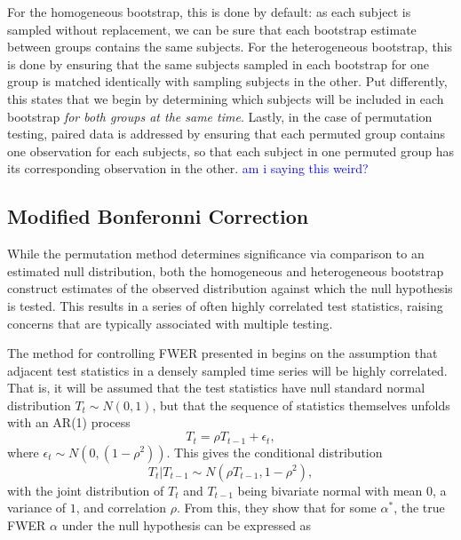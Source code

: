 \documentclass{article}
\providecommand{\cn}[1]{\textcolor{blue}{#1}}
\begin{document}
For the homogeneous bootstrap, this is done by default: as each subject is sampled without replacement, we can be sure that each bootstrap estimate between groups contains the same subjects. For the heterogeneous bootstrap, this is done by ensuring that the same subjects sampled in each bootstrap for one group is matched identically with sampling subjects in the other. Put differently, this states that we begin by determining which subjects will be included in each bootstrap \textit{for both groups at the same time}. Lastly, in the case of permutation testing, paired data is addressed by ensuring that each permuted group contains one observation for each subjects, so that each subject in one permuted group has its corresponding observation in the other. \cn{am i saying this weird?}

\subsection{Modified Bonferonni Correction}

While the permutation method determines significance via comparison to an estimated null distribution, both the homogeneous and heterogeneous bootstrap construct estimates of the observed distribution against which the null hypothesis is tested. This results in a series of often highly correlated test statistics, raising concerns that are typically associated with multiple testing. 

The method for controlling FWER presented in \citet{oleson2017detecting} begins on the assumption that adjacent test statistics in a densely sampled time series will be highly correlated. That is, it will be assumed that the test statistics have null standard normal distribution $T_t \sim N(0,1)$, but that the sequence of statistics themselves unfolds with an AR(1) process
\begin{equation}
T_t = \rho  T_{t-1} + \epsilon_t,
\end{equation}
where $\epsilon_t \sim N(0, (1 - \rho^2))$. This gives the conditional distribution
\begin{equation}
T_t | T_{t-1} \sim N(\rho T_{t-1}, 1 - \rho^2),
\end{equation}
with the joint distribution of $T_t$ and $T_{t-1}$ being bivariate normal with mean $0$, a variance of $1$, and correlation $\rho$. From this, they show that for some $\alpha^*$, the true FWER $\alpha$ under the null hypothesis can be expressed as 
\end{document}

